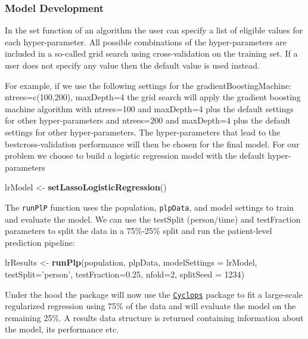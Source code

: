 \documentclass[]{article}
\newenvironment{Shaded}{\begin{snugshade}}{\end{snugshade}}
\newcommand{\KeywordTok}[1]{\textcolor[rgb]{0.13,0.29,0.53}{\textbf{#1}}}
\newcommand{\DataTypeTok}[1]{\textcolor[rgb]{0.13,0.29,0.53}{#1}}
\newcommand{\DecValTok}[1]{\textcolor[rgb]{0.00,0.00,0.81}{#1}}
\newcommand{\FloatTok}[1]{\textcolor[rgb]{0.00,0.00,0.81}{#1}}
\newcommand{\StringTok}[1]{\textcolor[rgb]{0.31,0.60,0.02}{#1}}
\newcommand{\NormalTok}[1]{#1}
\begin{document}
\subsubsection{Model Development}\label{model-development}

In the set function of an algorithm the user can specify a list of
eligible values for each hyper-parameter. All possible combinations of
the hyper-parameters are included in a so-called grid search using
cross-validation on the training set. If a user does not specify any
value then the default value is used instead.

For example, if we use the following settings for the
gradientBoostingMachine: ntrees=c(100,200), maxDepth=4 the grid search
will apply the gradient boosting machine algorithm with ntrees=100 and
maxDepth=4 plus the default settings for other hyper-parameters and
ntrees=200 and maxDepth=4 plus the default settings for other
hyper-parameters. The hyper-parameters that lead to the
bestcross-validation performance will then be chosen for the final
model. For our problem we choose to build a logistic regression model
with the default hyper-parameters

\begin{Shaded}
\begin{Highlighting}[]
\NormalTok{lrModel <-}\StringTok{ }\KeywordTok{setLassoLogisticRegression}\NormalTok{()}
\end{Highlighting}
\end{Shaded}

The \texttt{runPlP} function uses the population, \texttt{plpData}, and
model settings to train and evaluate the model. We can use the testSplit
(person/time) and testFraction parameters to split the data in a
75\%-25\% split and run the patient-level prediction pipeline:

\begin{Shaded}
\begin{Highlighting}[]
\NormalTok{lrResults <-}\StringTok{ }\KeywordTok{runPlp}\NormalTok{(population, plpData, }\DataTypeTok{modelSettings =}\NormalTok{ lrModel, }\DataTypeTok{testSplit=}\StringTok{'person'}\NormalTok{, }
                    \DataTypeTok{testFraction=}\FloatTok{0.25}\NormalTok{, }\DataTypeTok{nfold=}\DecValTok{2}\NormalTok{, }\DataTypeTok{splitSeed =} \DecValTok{1234}\NormalTok{)}
\end{Highlighting}
\end{Shaded}

Under the hood the package will now use the
\href{www.github.com/OHDSI/Cyclops}{\texttt{Cyclops}} package to fit a
large-scale regularized regression using 75\% of the data and will
evaluate the model on the remaining 25\%. A results data structure is
returned containing information about the model, its performance etc.
\end{document}
